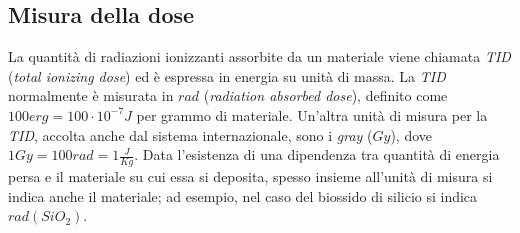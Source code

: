 \subsection{Misura della dose}
La quantità di radiazioni ionizzanti assorbite da un materiale viene chiamata \textit{TID} (\textit{total ionizing dose}) ed è espressa in energia su unità di massa.
La \textit{TID} normalmente è misurata in $rad$ (\textit{radiation absorbed dose}), definito come $100 erg  = 100 \cdot 10^{-7} J$ per grammo di materiale. Un'altra unità di misura per la \textit{TID}, accolta anche dal sistema internazionale, sono i \textit{gray} ($Gy$), dove $1 Gy = 100rad = 1\frac{J}{Kg}$.
Data l'esistenza di una dipendenza tra quantità di energia persa e il materiale su cui essa si deposita, spesso insieme all'unità di misura si indica anche il materiale; ad esempio, nel caso del biossido di silicio si indica $rad(SiO_{2})$. 



